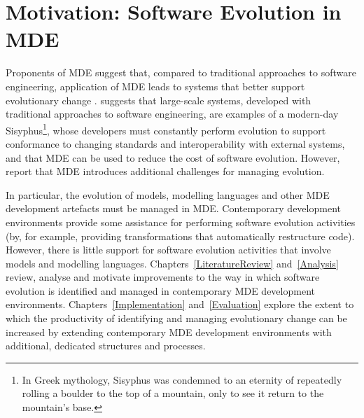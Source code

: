
\section{Motivation: Software Evolution in MDE}
Proponents of MDE suggest that, compared to traditional approaches to software engineering, application of MDE leads to systems that better support evolutionary change \cite{kleppe03mda}. \cite{frankel02mda} suggests that large-scale systems, developed with traditional approaches to software engineering, are examples of a  modern-day Sisyphus\footnote{In Greek mythology, Sisyphus was condemned to an eternity of repeatedly rolling a boulder to the top of a mountain, only to see it return to the mountain's base.}, whose developers must constantly perform evolution to support conformance to changing standards and interoperability with external systems, and that MDE can be used to reduce the cost of software evolution. However, \cite{Mens07} report that MDE introduces additional challenges for managing evolution.

In particular, the evolution of models, modelling languages and other MDE development artefacts must be managed in MDE. Contemporary development environments provide some assistance for performing software evolution activities (by, for example, providing transformations that automatically restructure code). However, there is little support for software evolution activities that involve models and modelling languages. Chapters~\ref{LiteratureReview} and~\ref{Analysis} review, analyse and motivate improvements to the way in which software evolution is identified and managed in contemporary MDE development environments. Chapters~\ref{Implementation} and~\ref{Evaluation} explore the extent to which the productivity of identifying and  managing evolutionary change can be increased by extending contemporary MDE development environments with additional, dedicated structures and processes.
